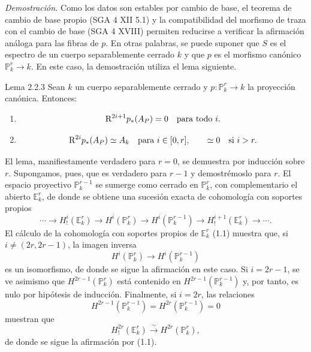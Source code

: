 \emph{Demostración.} Como los datos son estables por cambio de base, el teorema de cambio de base propio (SGA 4 XII 5.1) y la compatibilidad del morfismo de traza con el cambio de base (SGA 4 XVIII) permiten reducirse a verificar la afirmación análoga para las fibras de $p$. En otras palabras, se puede suponer que $S$ es el espectro de un cuerpo separablemente cerrado $k$ y que $p$ es el morfismo canónico $\mathbb P^r_k\to k$. En este caso, la demostración utiliza el lema siguiente.

\begin{statement}{Lema 2.2.3}
Sean $k$ un cuerpo separablemente cerrado y $p:\mathbb P_k^r\to k$ la proyección canónica. Entonces:
\begin{enumerate}[label=\alph*)]
\item
\[
\mathrm{R}^{2i+1}p_*(A_P)=0\quad\text{para todo }i.
\]
\item
\[
\mathrm{R}^{2i}p_*(A_P)\simeq A_k\quad\text{para }i\in[0,r],
\qquad
\simeq 0\quad\text{si }i>r.
\]
\end{enumerate}
\end{statement}

El lema, manifiestamente verdadero para $r=0$, se demuestra por inducción sobre $r$. Supongamos, pues, que es verdadero para $r-1$ y demostrémoslo para $r$. El espacio proyectivo $\mathbb P_k^{r-1}$ se sumerge como cerrado en $\mathbb P_k^r$, con complementario el abierto $\mathbb E_k^r$, de donde se obtiene una sucesión exacta de cohomología con soportes propios
\[
\cdots\longrightarrow H_!^i(\mathbb E_k^r)\longrightarrow H^i(\mathbb P_k^r)
\longrightarrow H^i(\mathbb P_k^{r-1})\longrightarrow H_!^{i+1}(\mathbb E_k^r)\longrightarrow\cdots.
\]
El cálculo de la cohomología con soportes propios de $\mathbb E_k^r$ (1.1) muestra que, si $i\ne(2r,2r-1)$, la imagen inversa
\[
H^i(\mathbb P_k^r)\longrightarrow H^i(\mathbb P_k^{r-1})
\]
es un isomorfismo, de donde se sigue la afirmación en este caso. Si $i=2r-1$, se ve asimismo que $H^{2r-1}(\mathbb P_k^r)$ está contenido en $H^{2r-1}(\mathbb P_k^{r-1})$ y, por tanto, es nulo por hipótesis de inducción. Finalmente, si $i=2r$, las relaciones
\[
H^{2r-1}(\mathbb P_k^{r-1})=H^{2r}(\mathbb P_k^{r-1})=0
\]
muestran que
\[
H_!^{2r}(\mathbb E_k^r)\xrightarrow{\sim}H^{2r}(\mathbb P_k^r),
\]
de donde se sigue la afirmación por (1.1).
